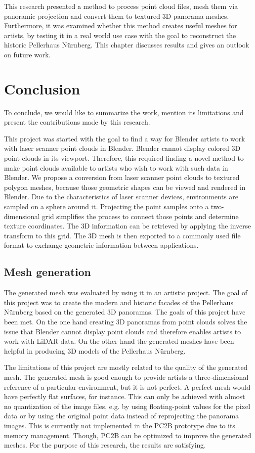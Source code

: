 This research presented a method to process point cloud files, mesh them via panoramic projection and convert them to textured 3D panorama meshes. Furthermore, it was examined whether this method creates useful meshes for artists, by testing it in a real world use case with the goal to reconstruct the historic Pellerhaus Nürnberg. This chapter discusses results and gives an outlook on future work.

\section{Conclusion}

To conclude, we would like to summarize the work, mention its limitations and present the contributions made by this research.

This project was started with the goal to find a way for Blender artists to work with laser scanner point clouds in Blender. Blender cannot display colored 3D point clouds in its viewport. Therefore, this required finding a novel method to make point clouds available to artists who wish to work with such data in Blender. We propose a conversion from laser scanner point clouds to textured polygon meshes, because those geometric shapes can be viewed and rendered in Blender. Due to the characteristics of laser scanner devices, environments are sampled on a sphere around it. Projecting the point samples onto a two-dimensional grid simplifies the process to connect those points and determine texture coordinates. The 3D information can be retrieved by applying the inverse transform to this grid. The 3D mesh is then exported to a commonly used file format to exchange geometric information between applications.

\subsection{Mesh generation}

The generated mesh was evaluated by using it in an artistic project. The goal of this project was to create the modern and historic facades of the Pellerhaus Nürnberg based on the generated 3D panoramas. The goals of this project have been met. On the one hand creating 3D panoramas from point clouds solves the issue that Blender cannot display point clouds and therefore enables artists to work with LiDAR data. On the other hand the generated meshes have been helpful in producing 3D models of the Pellerhaus Nürnberg.

The limitations of this project are mostly related to the quality of the generated mesh. The generated mesh is good enough to provide artists a three-dimensional reference of a particular environment, but it is not perfect. A perfect mesh would have perfectly flat surfaces, for instance. This can only be achieved with almost no quantization of the image files, e.g. by using floating-point values for the pixel data or by using the original point data instead of reprojecting the panorama images. This is currently not implemented in the PC2B prototype due to its memory management. Though, PC2B can be optimized to improve the generated meshes. For the purpose of this research, the results are satisfying.


